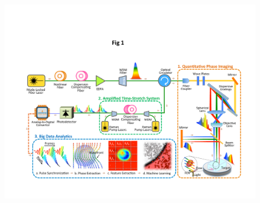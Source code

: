 \documentclass[aps,pra,reprint,superscriptaddress]{revtex4-1}
\begin{document}
\begin{figure}
\includegraphics[scale=0.70]{FigureSetup.pdf}

\end{figure}
\end{document}
